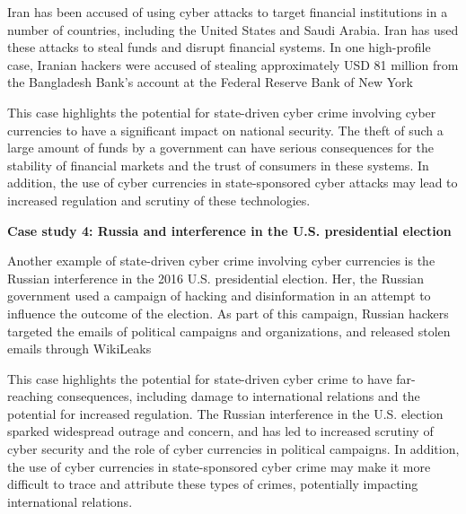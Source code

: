 Iran has been accused of using cyber attacks to target financial institutions in a number of countries, including the United States and Saudi Arabia. Iran has used these attacks to steal funds and disrupt financial systems. In one high-profile case, Iranian hackers were accused of stealing approximately USD 81 million from the Bangladesh Bank's account at the Federal Reserve Bank of New York \cite{herman_cybersecurity_2021}

This case highlights the potential for state-driven cyber crime involving cyber currencies to have a significant impact on national security. The theft of such a large amount of funds by a government can have serious consequences for the stability of financial markets and the trust of consumers in these systems. In addition, the use of cyber currencies in state-sponsored cyber attacks may lead to increased regulation and scrutiny of these technologies.

\textbf{Case study 4: Russia and interference in the U.S. presidential election}

Another example of state-driven cyber crime involving cyber currencies is the Russian interference in the 2016 U.S. presidential election. Her, the Russian government used a campaign of hacking and disinformation in an attempt to influence the outcome of the election. As part of this campaign, Russian hackers targeted the emails of political campaigns and organizations, and released stolen emails through WikiLeaks \cite{heemsbergen_wikileaksorg_2021}

This case highlights the potential for state-driven cyber crime to have far-reaching consequences, including damage to international relations and the potential for increased regulation. The Russian interference in the U.S. election sparked widespread outrage and concern, and has led to increased scrutiny of cyber security and the role of cyber currencies in political campaigns. In addition, the use of cyber currencies in state-sponsored cyber crime may make it more difficult to trace and attribute these types of crimes, potentially impacting international relations.

